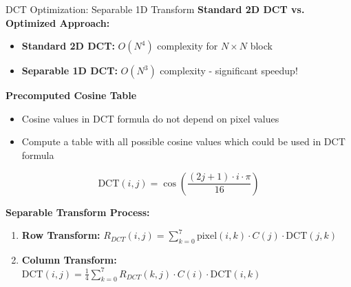 \documentclass[10pt]{beamer}
\begin{document}
\begin{frame}{DCT Optimization: Separable 1D Transform}
    \textbf{Standard 2D DCT vs. Optimized Approach:}
    \begin{itemize}
     \item \textbf{Standard 2D DCT:} $O(N^4)$ complexity for $N \times N$ block
     \item \textbf{Separable 1D DCT:} $O(N^3)$ complexity - significant speedup!
    \end{itemize}

    \vspace{0.3cm}
    \textbf{Precomputed Cosine Table}
    \begin{itemize}
     \item Cosine values in DCT formula do not depend on pixel values
     \item Compute a table with all possible cosine values which could be used in DCT formula
    \end{itemize}

    \vspace{-0.3cm}
    $$\text{DCT}(i,j) = \cos\left(\frac{(2j+1) \cdot i \cdot \pi}{16}\right)$$

    \textbf{Separable Transform Process:}
    \begin{enumerate}
     \item \textbf{Row Transform:} $R_{DCT}(i,j) = \sum_{k=0}^{7}\text{pixel}(i,k) \cdot C(j) \cdot \text{DCT}(j,k)$
     \item \textbf{Column Transform:} $\text{DCT}(i,j) = \frac{1}{4} \sum_{k=0}^{7} R_{DCT}(k,j) \cdot C(i) \cdot \text{DCT}(i,k)$
    \end{enumerate}

\end{frame}
\end{document}
